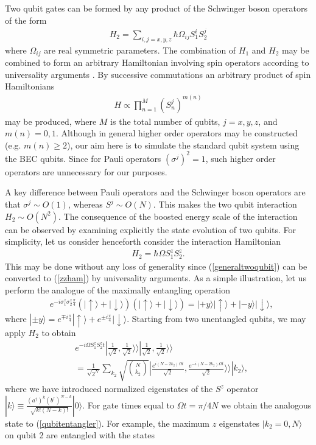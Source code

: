 \documentclass[
aps,%
12pt,%
final,%
notitlepage,%
oneside,%
onecolumn,%
nobibnotes,%
nofootinbib,%
superscriptaddress,%
noshowpacs,%
centertags]%
{revtex4}
\begin{document}
Two qubit gates can be formed by any product of the Schwinger boson operators of the form
%
\begin{align}
H_2 = \sum_{i,j = x,y,z} \hbar \Omega_{i j} S^{i}_1 S^{j}_2 
\end{align}
%
where $ \Omega_{i j} $ are real symmetric parameters. The combination of $ H_1 $ and $ H_2$ may be combined to form an arbitrary Hamiltonian involving spin operators according to universality arguments \cite{lloyd95}. By successive commutations an arbitrary product of spin Hamiltonians 
%
\begin{align}
\label{generaltwoqubit}
H \propto \prod_{n=1}^M (S^j_n)^{m(n)} 
\end{align}
%
may be produced, where $ M $ is the total number of qubits, $ j = x,y,z $, and $ m(n) = 0,1 $. Although in general 
higher order operators may be constructed (e.g. $ m(n) \ge 2$), our aim here is to simulate the standard qubit system using the BEC qubits. Since for Pauli operators $ (\sigma^j)^2 = 1 $, such higher order operators are unnecessary for our purposes. 

A key difference between Pauli operators and the Schwinger boson operators are that $ \sigma^j \sim O(1) $, whereas $ S^j \sim O(N) $.  This makes the two qubit interaction $ H_2 \sim O(N^2) $.  The consequence of the boosted energy scale of the interaction can be observed by examining explicitly the state evolution of two qubits. For simplicity, let us consider henceforth consider the interaction Hamiltonian 
%
\begin{align}
\label{zzham}
H_2 = \hbar \Omega S^z_1 S^z_2 .
\end{align}
%
This may be done without any loss of generality since (\ref{generaltwoqubit}) can be converted to (\ref{zzham}) by universality arguments. 
As a simple illustration, let us perform the analogue of the maximally entangling operation 
%
\begin{align}
& e^{-i  \sigma^z_1 \sigma^z_2 \frac{\pi}{4} } ( | \uparrow \rangle + | \downarrow \rangle ) ( | \uparrow \rangle + | \downarrow \rangle ) =  | + y \rangle | \uparrow \rangle  + | - y \rangle | \downarrow \rangle, \label{qubitentangler}
\end{align}
%
where $ | \pm y \rangle = e^{\mp i\frac{\pi}{4}} | \uparrow \rangle + e^{\pm i\frac{\pi}{4}} | \downarrow \rangle $. Starting from two unentangled qubits, we may apply $ H_2 $ to obtain
%
\begin{align}
& e^{-i \Omega S^z_1 S^z_2 t} | \frac{1}{\sqrt{2}}, \frac{1}{\sqrt{2}} \rangle \rangle | \frac{1}{\sqrt{2}}, \frac{1}{\sqrt{2}} \rangle \rangle \nonumber \\
& = \frac{1}{\sqrt{2^N}} \sum_{k_2} \sqrt{N \choose k_2}  | \frac{e^{i(N-2 k_2)\Omega t}}{\sqrt{2}}  , \frac{e^{-i(N-2 k_2) \Omega t}}{\sqrt{2}}  \rangle \rangle |k_2 \rangle ,
\label{bosonqubitentanglement}
\end{align}
%
where we have introduced normalized eigenstates of the $ S^z $ operator $ |k \rangle \equiv \frac{(a^\dagger)^k (b^\dagger)^{N-k}}{\sqrt{k!(N-k)!}} |0 \rangle $.  For gate times equal to $ \Omega t = \pi/4N   $ we obtain the analogous state to (\ref{qubitentangler}). For example, the maximum $z$ eigenstates $ |k_2=0,N \rangle $ on qubit 2 are entangled with the states  
\end{document}
